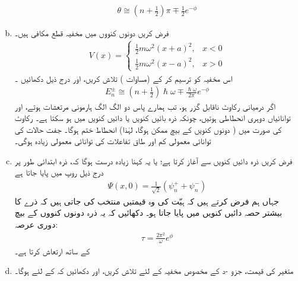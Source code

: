 \begin{enumerate}[a.]
\begin{align}
	\theta\cong\left(n+\frac{1}{2}\right)\pi\mp\frac{1}{2}e^{-\phi}
\end{align}
\item
 فرض کریں دونوں  کنووں میں مخفیہ  قطع مکافی ہیں۔
\begin{align}
	V(x)=
	\begin{cases}
		\frac{1}{2}m\omega^{2}(x+a)^{2},& x< 0 \\
		\frac{1}{2}m\omega^{2}(x-a)^{2},& x> 0
	\end{cases}
\end{align}
اس مخفیہ کو ترسیم کر کے  (مساوات )  تلاش کریں، اور درج ذیل دکھائیں ۔
\begin{align}\label{مساوات_وقب_نتیجہ_قطع_مکافی}
	E^{\pm}_{n}\cong\left(n+\frac{1}{2}\right)\hslash\omega\mp\frac{\hslash\omega}{2\pi} e^{-\phi}
\end{align}
  اگر درمیانی رکاوٹ ناقابل گزر ہو،  تب ہمارے پاس دو الگ الگ ہارمونی مرتعشات ہوتے، اور توانائیاں  دوہری انحطاطی ہوتیں،  چونکہ ذرہ بائیں کنویں  یا دائیں کنویں میں ہو سکتا ہے۔   رکاوٹ کی صورت میں ( دونوں کنویں کے بیچ   ممکن ہوگا، لہٰذا)  انحطاط ختم ہوگا۔ جفت حالات  کی توانائی معمولی کم اور طاق تفاعلات  کی توانائی معمولی زیادہ ہوگی۔
\item
 فرض کریں ذرہ دائیں کنویں سے آغاز کرتا ہے؛ یا یہ کہنا زیادہ درست ہوگا کہ، ذرہ ابتدائی طور پر درج ذیل روپ میں پایا جاتا ہے 
\begin{align*}
	\Psi(x,0)=\frac{1}{\sqrt{2}}(\psi^{+}_{n}+\psi^{-}_{n})
\end{align*}
جہاں ہم فرض کرتے ہیں کہ   ہیّت  کی وہ قیمتیں منتخب کی جاتی ہیں  کہ ذرے کا بیشتر حصہ دائیں کنویں میں پایا جاتا ہو۔ دکھائیں کہ یہ ذرہ دونوں کنووں کے بیچ  دوری عرصہ:
\begin{align}
	\tau=\frac{2\pi^{2}}{\omega} e^{\phi}
\end{align}
کے ساتھ ارتعاش کرتا ہے۔
\item
 متغیر  کی قیمت،  جزو -د  کے مخصوص مخفیہ کے لئے تلاش کریں، اور دکھائیں کہ  کے لئے  ہوگا۔
 \end{enumerate}
